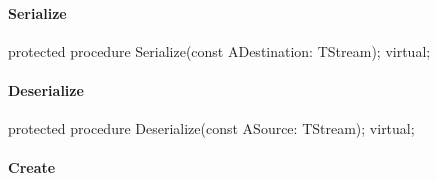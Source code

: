 \documentclass{report}
\newif\ifpdf
\begin{document}
\paragraph*{Serialize}\hspace*{\fill}

\label{PasDoc_Items.TBaseItems-Serialize}
\begin{list}{}{
\setlength{\itemindent}{0cm}
\setlength{\listparindent}{0cm}
\setlength{\leftmargin}{\evensidemargin}
\addtolength{\leftmargin}{\tmplength}
\settowidth{\labelsep}{X}
\addtolength{\leftmargin}{\labelsep}
\setlength{\labelwidth}{\tmplength}
}
\item[\textbf{Declaration}\hfill]
\ifpdf
\begin{flushleft}
\fi
\begin{ttfamily}
protected procedure Serialize(const ADestination: TStream); virtual;\end{ttfamily}

\ifpdf
\end{flushleft}
\fi

\end{list}
\paragraph*{Deserialize}\hspace*{\fill}

\label{PasDoc_Items.TBaseItems-Deserialize}
\begin{list}{}{
\setlength{\itemindent}{0cm}
\setlength{\listparindent}{0cm}
\setlength{\leftmargin}{\evensidemargin}
\addtolength{\leftmargin}{\tmplength}
\settowidth{\labelsep}{X}
\addtolength{\leftmargin}{\labelsep}
\setlength{\labelwidth}{\tmplength}
}
\item[\textbf{Declaration}\hfill]
\ifpdf
\begin{flushleft}
\fi
\begin{ttfamily}
protected procedure Deserialize(const ASource: TStream); virtual;\end{ttfamily}

\ifpdf
\end{flushleft}
\fi

\end{list}
\paragraph*{Create}\hspace*{\fill}
\end{document}

